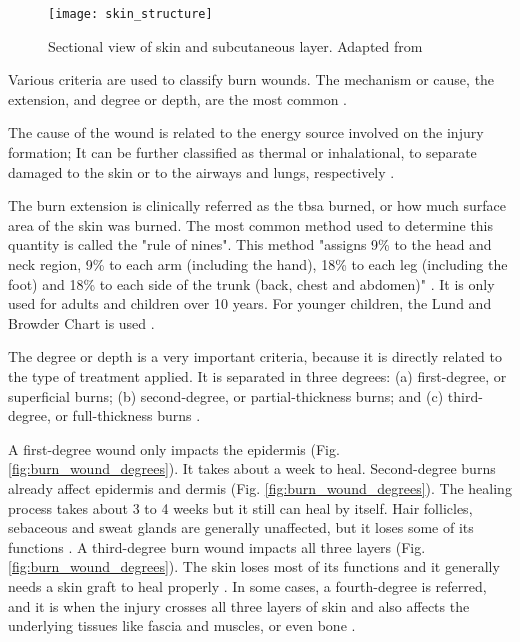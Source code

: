 \begin{figure}[htbp]
	\centering
	\texttt{[image: skin\_structure]}
	\caption{Sectional view of skin and subcutaneous layer. Adapted from \cite{Tortora2009_principles_anatomy_physiology}}
	\label{fig:skin_structure}
\end{figure}

Various criteria are used to classify burn wounds. The mechanism or cause, the extension, and degree or depth, are the most common \cite{who_unicef2008_burns_chapter}. 

The cause of the wound is related to the energy source involved on the injury formation; It can be further classified as thermal or inhalational, to separate damaged to the skin or to the airways and lungs, respectively \cite{who_unicef2008_burns_chapter}.

The burn extension is clinically referred as the \gls{tbsa} burned, or how much surface area of the skin was burned. The most common method used to determine this quantity is called the "rule of nines". This method "assigns 9\% to the head and neck region, 9\% to each arm (including the hand), 18\% to each leg (including the foot) and 18\% to each side of the trunk (back, chest and abdomen)" \cite{who_unicef2008_burns_chapter}. It is only used for adults and children over 10 years. For younger children, the Lund and Browder Chart is used \cite{MacLennan1998_anesthesia_thermal_injury}. 

The degree or depth is a very important criteria, because it is directly related to the type of treatment applied. It is separated in three degrees: (a) first-degree, or superficial burns; (b) second-degree, or partial-thickness burns; and (c) third-degree, or full-thickness burns \cite{who_unicef2008_burns_chapter}. 

A first-degree wound only impacts the epidermis (Fig. \ref{fig:burn_wound_degrees}). It takes about a week to heal. Second-degree burns already affect epidermis and dermis (Fig. \ref{fig:burn_wound_degrees}). The healing process takes about 3 to 4 weeks but it still can heal by itself. Hair follicles, sebaceous and sweat glands are generally unaffected, but it loses some of its functions \cite{Tortora2009_principles_anatomy_physiology}. A third-degree burn wound impacts all three layers (Fig. \ref{fig:burn_wound_degrees}). The skin loses most of its functions \cite{Tortora2009_principles_anatomy_physiology} and it generally needs a skin graft to heal properly \cite{who_unicef2008_burns_chapter}. In some cases, a fourth-degree is referred, and it is when the injury crosses all three layers of skin and also affects the underlying tissues like fascia and muscles, or even bone \cite{Vijayavenkataraman2016_stateart_modelling_materials_processing}.

